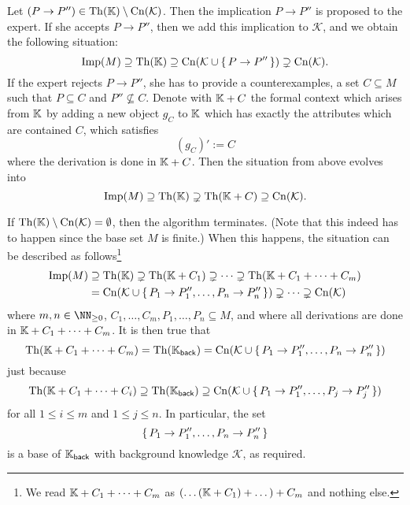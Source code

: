 Let $(P \to P'') \in \operatorname{Th}({\mathbb{K}}) \setminus \operatorname{Cn}(\mathcal{K})$.  Then the implication $P \to
P''$ is proposed to the expert.  If she accepts $P \to P''$, then we add this implication
to $\mathcal{K}$, and we obtain the following situation:
\begin{equation*}
  \operatorname{Imp}(M) \supseteq \operatorname{Th}({\mathbb{K}}) \supseteq \operatorname{Cn}(\mathcal{K} \cup {\ensuremath{\{\, P \to P'' \,\}}})
  \supsetneq \operatorname{Cn}(\mathcal{K}).
\end{equation*}
If the expert rejects $P \to P''$, she has to provide a counterexamples, \ie a set $C
\subseteq M$ such that $P \subseteq C$ and $P'' \not\subseteq C$.  Denote with ${\mathbb{K}} +
C$ the formal context which arises from ${\mathbb{K}}$ by adding a new object $g_C$ to ${\mathbb{K}}$
which has exactly the attributes which are contained $C$, \ie which satisfies
\begin{equation*}
  (g_C)' := C
\end{equation*}
where the derivation is done in ${\mathbb{K}} + C$.  Then the situation from above evolves into
\begin{equation*}
  \operatorname{Imp}(M) \supseteq \operatorname{Th}({\mathbb{K}}) \supsetneq \operatorname{Th}({\mathbb{K}} + C) \supseteq \operatorname{Cn}(\mathcal{K}).
\end{equation*}

If $\operatorname{Th}({\mathbb{K}}) \setminus \operatorname{Cn}(\mathcal{K}) = \emptyset$, then the algorithm terminates.
(Note that this indeed has to happen since the base set $M$ is finite.)  When this
happens, the situation can be described as follows\footnote{We read ${\mathbb{K}} + C_1 + \dots
  + C_m$ as $(\dots({\mathbb{K}} + C_1) + \dots ) + C_m$ and nothing else.}
\begin{align*}
  \operatorname{Imp}(M) &\supseteq \operatorname{Th}({\mathbb{K}}) \supsetneq \operatorname{Th}({\mathbb{K}} + C_1) \supsetneq \dots \supsetneq
  \operatorname{Th}({\mathbb{K}} + C_1 + \dots + C_m) \\ &= \operatorname{Cn}(\mathcal{K} \cup {\ensuremath{\{\, P_1 \to P_1'', \dots, P_n
    \to P_n'' \,\}}}) \supsetneq \dots \supsetneq \operatorname{Cn}(\mathcal{K})
\end{align*}
where $m, n \in \NN_{\geq 0}$, $C_1, \dots, C_m, P_1, \dots, P_n \subseteq M$, and where
all derivations are done in ${\mathbb{K}} + C_1 + \dots + C_m$.  It is then true that
\begin{equation*}
  \operatorname{Th}({\mathbb{K}} + C_1 + \dots + C_m) = \operatorname{Th}({\mathbb{K}}_{\mathsf{back}}) = \operatorname{Cn}(\mathcal{K} \cup
  {\ensuremath{\{\, P_1 \to P_1'', \dots, P_n \to P_n'' \,\}}})
\end{equation*}
just because
\begin{equation*}
  \operatorname{Th}({\mathbb{K}} + C_1 + \dots + C_i) \supseteq \operatorname{Th}({\mathbb{K}}_{\mathsf{back}}) \supseteq
  \operatorname{Cn}(\mathcal{K} \cup {\ensuremath{\{\, P_1 \to P_1'', \dots, P_j \to P_j''\,\}}} )
\end{equation*}
for all $1 \leq i \leq m$ and $1 \leq j \leq n$.  In particular, the set
\begin{equation*}
  {\ensuremath{\{\,P_1 \to P_1'', \dots, P_n \to P_n''\,\}}}
\end{equation*}
is a base of ${\mathbb{K}}_{\mathsf{back}}$ with background knowledge $\mathcal{K}$, as
required.

